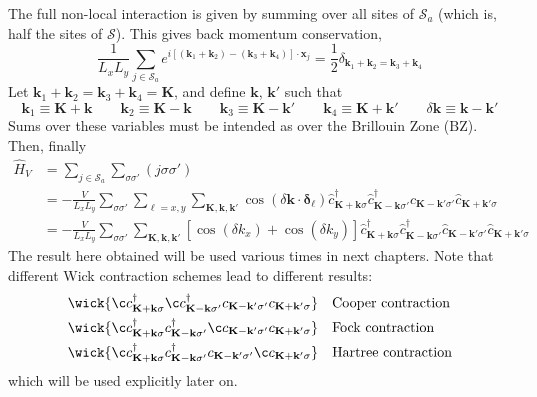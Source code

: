 The full non-local interaction is given by summing over all sites of $\mathcal{S}_a$ (which is, half the sites of $\mathcal{S}$). This gives back momentum conservation,
\[
\frac{1}{L_xL_y} \sum_{j \in \mathcal{S}_a} e^{i \left[ (\mathbf{k}_1 + \mathbf{k}_2) - (\mathbf{k}_3 + \mathbf{k}_4) \right] \cdot \mathbf{x}_j} = \frac{1}{2} \delta_{\mathbf{k}_1 + \mathbf{k}_2 = \mathbf{k}_3 + \mathbf{k}_4}
\]
Let $\mathbf{k}_1 + \mathbf{k}_2 = \mathbf{k}_3 + \mathbf{k}_4 = \mathbf{K}$, and define $\mathbf{k}$, $\mathbf{k}'$ such that
\[
\mathbf{k}_1 \equiv \mathbf{K} + \mathbf{k} 
\qquad
\mathbf{k}_2 \equiv \mathbf{K} - \mathbf{k} 
\qquad
\mathbf{k}_3 \equiv \mathbf{K} - \mathbf{k}' 
\qquad
\mathbf{k}_4 \equiv \mathbf{K} + \mathbf{k}'
\qquad
\delta \mathbf{k} \equiv \mathbf{k}-\mathbf{k}'
\]
Sums over these variables must be intended as over the Brillouin Zone ($\mathrm{BZ}$). Then, finally
\begin{align}
	\hat H_V &= \sum_{j \in \mathcal{S}_a} \sum_{\sigma\sigma'} (j\sigma\sigma') \nonumber \\
	&= - \frac{V}{L_x L_y} \sum_{\sigma\sigma'} \sum_{\ell = x,y} \sum_{\mathbf{K}, \mathbf{k}, \mathbf{k}'} \cos\left(
		\delta \mathbf{k} \cdot \bm{\delta}_\ell
	\right)	\hat c_{\mathbf{K}+\mathbf{k} \sigma}^\dagger \hat c_{\mathbf{K}-\mathbf{k} \sigma'}^\dagger \hat c_{\mathbf{K}-\mathbf{k}' \sigma'} \hat c_{\mathbf{K}+\mathbf{k}'\sigma} \nonumber \\
	&= - \frac{V}{L_x L_y} 	\sum_{\sigma\sigma'}
	\sum_{\mathbf{K}, \mathbf{k}, \mathbf{k}'} \left[
		\cos \left(
			\delta k_x
		\right)	+ \cos \left(
		\delta k_y
			\right)	
	\right]	\hat c_{\mathbf{K}+\mathbf{k} \sigma}^\dagger \hat c_{\mathbf{K}-\mathbf{k} \sigma'}^\dagger \hat c_{\mathbf{K}-\mathbf{k}' \sigma'} \hat c_{\mathbf{K}+\mathbf{k}'\sigma} \label{eq:reciprocal-space-non-local-interaction-explicit}
\end{align}
The result here obtained will be used various times in next chapters. Note that different Wick contraction schemes lead to different results:
\begin{align}
	&\wick{
		\c
		c_{\mathbf{K}+\mathbf{k} \sigma}^\dagger 
		\c
		c_{\mathbf{K}-\mathbf{k} \sigma'}^\dagger c_{\mathbf{K}-\mathbf{k}' \sigma'} c_{\mathbf{K}+\mathbf{k}'\sigma}
	} &&\text{Cooper contraction} \label{eq:reciprocal-space-cooper-contraction} \\
	&\wick{
		\c
		c_{\mathbf{K}+\mathbf{k} \sigma}^\dagger 
		c_{\mathbf{K}-\mathbf{k} \sigma'}^\dagger
		\c
		c_{\mathbf{K}-\mathbf{k}' \sigma'} c_{\mathbf{K}+\mathbf{k}'\sigma}
	} &&\text{Fock contraction} \label{eq:reciprocal-space-fock-contraction} \\
	&\wick{
		\c
		c_{\mathbf{K}+\mathbf{k} \sigma}^\dagger 
		c_{\mathbf{K}-\mathbf{k} \sigma'}^\dagger c_{\mathbf{K}-\mathbf{k}' \sigma'}
		\c
		c_{\mathbf{K}+\mathbf{k}'\sigma}
	} &&\text{Hartree contraction} \label{eq:reciprocal-space-hartree-contraction}
\end{align}
which will be used explicitly later on.

